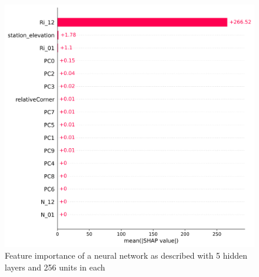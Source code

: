 \begin{figure}[h]
    \centering
    \includegraphics[scale = 0.6]{Figures/shap_bar_nn_256_example100.png}
    \caption[Feature importance of a neural network.]{Feature importance of a neural network as described with 5 hidden layers and 256 units in each}
    \label{fig:ShapleyWaterfallFirstTry}
\end{figure}